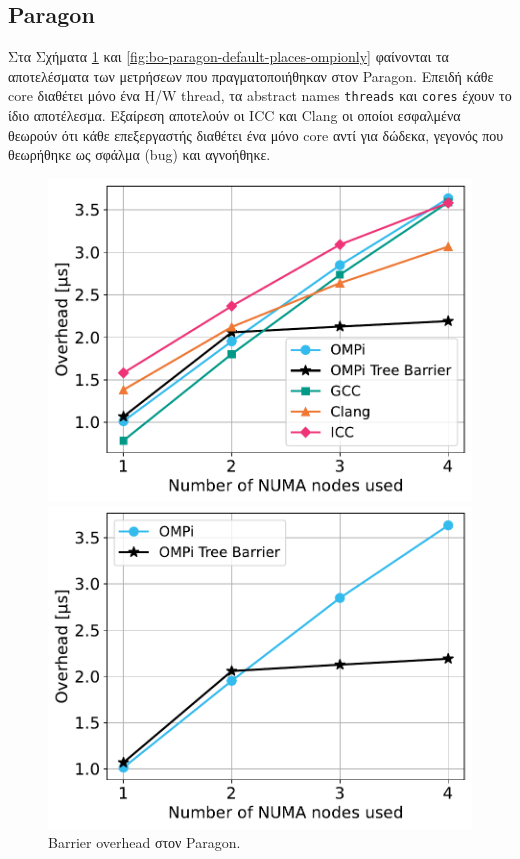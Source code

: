 \subsection{Paragon}
Στα Σχήματα \ref{fig:bo-paragon-default-places} και \ref{fig:bo-paragon-default-places-ompionly} φαίνονται τα αποτελέσματα των μετρήσεων που πραγματοποιήθηκαν στον Paragon. Επειδή κάθε core διαθέτει μόνο ένα H/W thread, τα abstract names \texttt{threads} και \texttt{cores} έχουν το ίδιο αποτέλεσμα. Εξαίρεση αποτελούν οι ICC και Clang οι οποίοι εσφαλμένα θεωρούν ότι κάθε επεξεργαστής διαθέτει ένα μόνο core αντί για δώδεκα, γεγονός που θεωρήθηκε ως σφάλμα (bug) και αγνοήθηκε.

\begin{figure}
    \centering
    \begin{minipage}{0.48\textwidth}
        \centering
        \includegraphics[width=1\textwidth]{Figures/paragon_epcc_20210825_132109/default-places_threads_close.pdf}
		\caption{Barrier overhead στον Paragon.}
		\label{fig:bo-paragon-default-places}
    \end{minipage}\hfill
    \begin{minipage}{0.48\textwidth}
        \centering
        \includegraphics[width=1\textwidth]{Figures/paragon_epcc_20210825_132109/ompi_default-places_threads_close.pdf}

\end{minipage}
\end{figure}
